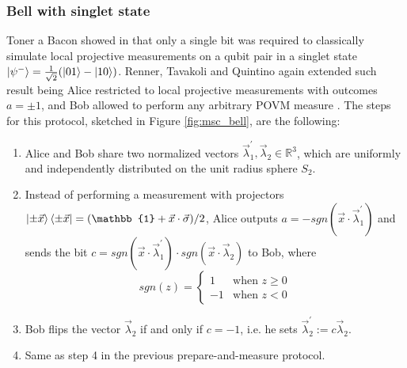 \subsubsection{Bell with singlet state}\label{section:protocol_bell}
Toner a Bacon showed in \cite{toner2003} that only a single bit was required to classically simulate local projective measurements on a qubit pair in a singlet state $\ket{\psi^{-}}=\frac{1}{\sqrt{2}}(\ket{01} - \ket{10})$. Renner, Tavakoli and Quintino again extended such result being Alice restricted to local projective measurements with outcomes $a=\pm 1$, and Bob allowed to perform any arbitrary POVM measure \cite{renner2022}. The steps for this protocol, sketched in Figure \ref{fig:msc_bell}, are the following:
\begin{enumerate}
 \item Alice and Bob share two normalized vectors $\vec{\lambda}_1^{\prime}, \vec{\lambda}_2 \in \mathbb{R}^{3}$, which are uniformly and independently distributed on the unit radius sphere $S_2$.
 \item Instead of performing a measurement with projectors $\ket{\pm\vec{x}}\bra{\pm\vec{x}} = (\mathbb{1} + \vec{x} \cdot \vec{\sigma})/2$, Alice outputs $a = -sgn(\vec{x} \cdot \vec{\lambda}^{\prime}_1)$ and sends the bit $c = sgn(\vec{x} \cdot \vec{\lambda}^{\prime}_1) \cdot sgn(\vec{x} \cdot \vec{\lambda}_2)$ to Bob, where 
 \begin{equation}
sgn(z) =
    \begin{cases}
      1 & \text{when $z \ge 0$}\\
      -1 & \text{when $z<0$}
    \end{cases} 
\end{equation}
 \item Bob flips the vector $\vec{\lambda}_2$ if and only if $c=-1$, i.e. he sets $\vec{\lambda}^{\prime}_{2} := c \vec{\lambda}_{2}$.
 \item Same as step 4 in the previous prepare-and-measure protocol.
\end{enumerate}

